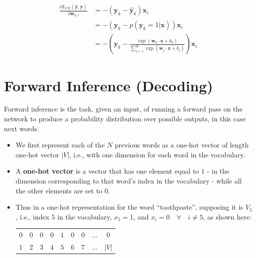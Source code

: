 \begin{align}
    \frac{\partial L_{CE}(\mathbf{\hat{y}}, \mathbf{y})}{\partial \mathbf{w}_{k,i}} 
    &= -(\mathbf{y}_{k} - \mathbf{\hat{y}}_{k})\mathbf{x}_{i}\\
    &=-(\mathbf{y}_{k} - p(\mathbf{y}_{k}=1|\mathbf{x}))\mathbf{x}_{i}\\
    &=-\left(\mathbf{y}_{k} - \displaystyle\frac{\exp(\mathbf{w}_{k}\cdot \mathbf{x} + b_{k})}{\sum_{j=1}^{K} \exp(\mathbf{w}_{j}\cdot \mathbf{x} + b_{j})}\right)\mathbf{x}_i
\end{align}

\section{Forward Inference (Decoding)}
Forward inference is the task, given an input, of running a forward pass on the network to produce a probability distribution over possible outputs, in this case next words.

\begin{itemize}
    \item We first represent each of the $N$ previous words as a one-hot vector of length one-hot vector $|V|$, i.e., with one dimension for each word in the vocabulary.
    \item A \textbf{one-hot vector} is a vector that has one element equal to $1$ - in the dimension corresponding to that word’s index in the vocabulary - while all the other elements are set to $0$.
    \item Thus in a one-hot representation for the word “toothpaste”, supposing it is $V_5$, i.e., index $5$ in the vocabulary, $x_5 = 1$, and $x_i = 0 \quad\forall\quad i \neq 5$, as shown here:\\
    \begin{table}[h!]
        \centering
        \begin{tabular}{c c c c c c c c c}
            $0$ & $0$ & $0$ & $0$ & $1$ & $0$ & $0$ & ... & $0$\\
            $1$ & $2$ & $3$ & $4$ & $5$ & $6$ & $7$ & ... & $|V|$
        \end{tabular}
    \end{table}
\end{itemize}

